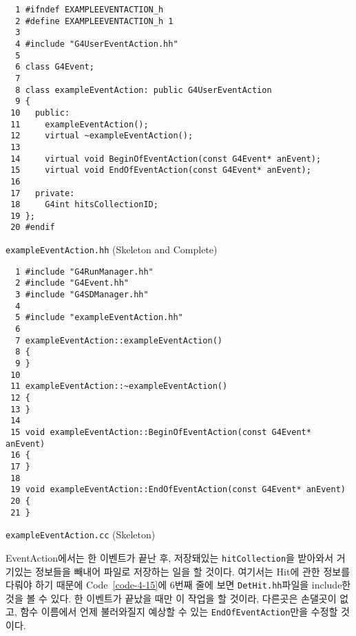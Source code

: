 \begin{code}[p]
\begin{lstlisting}
  1 #ifndef EXAMPLEEVENTACTION_h
  2 #define EXAMPLEEVENTACTION_h 1
  3 
  4 #include "G4UserEventAction.hh"
  5 
  6 class G4Event;
  7 
  8 class exampleEventAction: public G4UserEventAction
  9 {
 10   public:
 11     exampleEventAction();
 12     virtual ~exampleEventAction();
 13 
 14     virtual void BeginOfEventAction(const G4Event* anEvent);
 15     virtual void EndOfEventAction(const G4Event* anEvent);
 16 
 17   private:
 18     G4int hitsCollectionID;
 19 };
 20 #endif
\end{lstlisting}
\caption{\texttt{exampleEventAction.hh} (Skeleton and Complete)
\label{code-4-13}}
\end{code}

\begin{code}[p]
\begin{lstlisting}
  1 #include "G4RunManager.hh"
  2 #include "G4Event.hh"
  3 #include "G4SDManager.hh"
  4 
  5 #include "exampleEventAction.hh"
  6 
  7 exampleEventAction::exampleEventAction()
  8 {
  9 }
 10 
 11 exampleEventAction::~exampleEventAction()
 12 {
 13 }
 14 
 15 void exampleEventAction::BeginOfEventAction(const G4Event* anEvent)
 16 {
 17 }
 18 
 19 void exampleEventAction::EndOfEventAction(const G4Event* anEvent)
 20 {
 21 }
\end{lstlisting}
\caption{\texttt{exampleEventAction.cc} (Skeleton) \label{code-4-14}}
\end{code}

EventAction에서는 한 이벤트가 끝난 후, 저장돼있는 \texttt{hitCollection}을
받아와서 거기있는 정보들을 빼내어 파일로 저장하는 일을 할 것이다. 여기서는
Hit에 관한 정보를 다뤄야 하기 때문에 Code~\ref{code-4-15}에 6번째 줄에 보면
\texttt{DetHit.hh}파일을 include한 것을 볼 수 있다. 한 이벤트가 끝났을 때만 이
작업을 할 것이라, 다른곳은 손댈곳이 없고, 함수 이름에서 언제 불러와질지 예상할
수 있는 \texttt{EndOfEventAction}만을 수정할 것이다.

